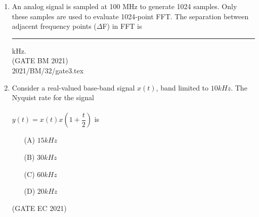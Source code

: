 \begin{enumerate}[label=\thechapter.\arabic*,ref=\thechapter.\theenumi]
\item An analog signal is sampled at 100 MHz to generate 1024 samples. Only
these samples are used to evaluate 1024-point FFT. The separation between
adjacent frequency points ($\Delta$F) in FFT is \rule{1cm}{0.5mm} kHz.\\
\hfill (GATE BM 2021)\\
\solution
 {2021/BM/32/gate3.tex}
\newpage

\item Consider a real-valued base-band signal $x(t)$, band limited to $10kHz$. The Nyquist rate for the signal \\\\
$y(t) = x(t)x(1+\dfrac{t}{2})$ is\\

\begin{enumerate}
\item[(A)] $15kHz$
\item[(B)] $30kHz$
\item[(C)] $60kHz$
\item[(D)] $20kHz$
\end{enumerate}
\hfill{(GATE EC 2021)}\\
\solution

\newpage

\end{enumerate}
